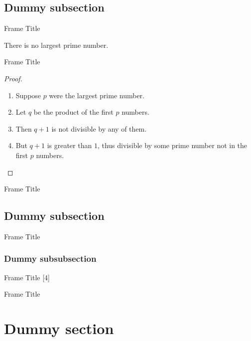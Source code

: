\subsection{Dummy subsection}
\begin{frame}{Frame Title}
\begin{theorem}
There is no largest prime number.
\end{theorem}
\end{frame}

\begin{frame}{Frame Title}
\begin{proof}
\begin{enumerate}
\item<1-| alert@1> Suppose $p$ were the largest prime number.
\item<2-> Let $q$ be the product of the first $p$ numbers.
\item<3-> Then $q+1$ is not divisible by any of them.
\item<4-> But $q + 1$ is greater than $1$, thus divisible by some prime
number not in the first $p$ numbers.\qedhere
\end{enumerate}
\end{proof}
\end{frame}


\begin{frame}{Frame Title}
\blinddescription
\end{frame}

\subsection{Dummy subsection}
\begin{frame}[allowframebreaks]{Frame Title}
\blindmathpaper
\end{frame}

\subsubsection{Dummy subsubsection}
\begin{frame}{Frame Title}
[4]
\end{frame}

\begin{frame}{Frame Title}
\blinddescription
\end{frame}

\section{Dummy section}

